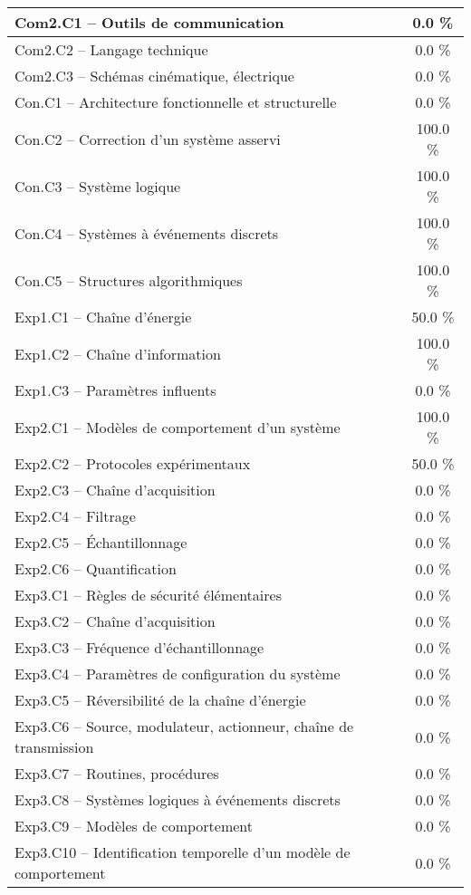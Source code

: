 \begin{center}
\begin{tabular}{|p{.7\linewidth}|c|}
Com2.C1 -- Outils de communication&0.0 \% \\ \hline 
Com2.C2 -- Langage technique&0.0 \% \\ \hline 
Com2.C3 -- Schémas cinématique, électrique&0.0 \% \\ \hline 
Con.C1 -- Architecture fonctionnelle et structurelle&0.0 \% \\ \hline 
Con.C2 -- Correction d’un système asservi&100.0 \% \\ \hline 
Con.C3 -- Système logique&100.0 \% \\ \hline 
Con.C4 -- Systèmes à événements discrets&100.0 \% \\ \hline 
Con.C5 -- Structures algorithmiques&100.0 \% \\ \hline 
Exp1.C1 -- Chaîne d’énergie&50.0 \% \\ \hline 
Exp1.C2 -- Chaîne d’information&100.0 \% \\ \hline 
Exp1.C3 -- Paramètres influents&0.0 \% \\ \hline 
Exp2.C1 -- Modèles de comportement d’un système&100.0 \% \\ \hline 
Exp2.C2 -- Protocoles expérimentaux&50.0 \% \\ \hline 
Exp2.C3 -- Chaîne d’acquisition&0.0 \% \\ \hline 
Exp2.C4 -- Filtrage&0.0 \% \\ \hline 
Exp2.C5 -- Échantillonnage&0.0 \% \\ \hline 
Exp2.C6 -- Quantification&0.0 \% \\ \hline 
Exp3.C1 -- Règles de sécurité élémentaires&0.0 \% \\ \hline 
Exp3.C2 -- Chaîne d'acquisition&0.0 \% \\ \hline 
Exp3.C3 -- Fréquence d’échantillonnage&0.0 \% \\ \hline 
Exp3.C4 -- Paramètres de configuration du système&0.0 \% \\ \hline 
Exp3.C5 -- Réversibilité de la chaîne d’énergie&0.0 \% \\ \hline 
Exp3.C6 -- Source, modulateur, actionneur, chaîne de transmission&0.0 \% \\ \hline 
Exp3.C7 -- Routines, procédures &0.0 \% \\ \hline 
Exp3.C8 -- Systèmes logiques à événements discrets&0.0 \% \\ \hline 
Exp3.C9 -- Modèles de comportement&0.0 \% \\ \hline 
Exp3.C10 -- Identification temporelle d’un modèle de comportement&0.0 \% \\ \hline 

\end{tabular}
\end{center}
